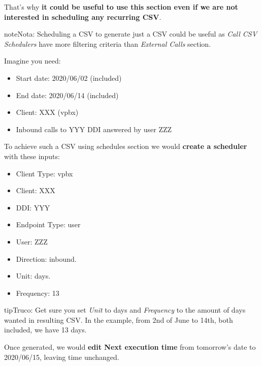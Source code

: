 \documentclass[letterpaper,10pt,spanish]{sphinxmanual}
\begin{document}
That's why \textbf{it could be useful to use this section even if we are not interested in scheduling any recurring CSV}.

\begin{notice}{note}{Nota:}
Scheduling a CSV to generate just a CSV could be useful as \emph{Call CSV Schedulers} have more filtering criteria
than \emph{External Calls} section.
\end{notice}

Imagine you need:
\begin{itemize}
\item {} 
Start date: 2020/06/02 (included)

\item {} 
End date: 2020/06/14 (included)

\item {} 
Client: XXX (vpbx)

\item {} 
Inbound calls to YYY DDI answered by user ZZZ

\end{itemize}

To achieve such a CSV using schedules section we would \textbf{create a scheduler} with these inputs:
\begin{itemize}
\item {} 
Client Type: vpbx

\item {} 
Client: XXX

\item {} 
DDI: YYY

\item {} 
Endpoint Type: user

\item {} 
User: ZZZ

\item {} 
Direction: inbound.

\item {} 
Unit: days.

\item {} 
Frequency: 13

\end{itemize}

\begin{notice}{tip}{Truco:}
Get sure you set \emph{Unit} to days and \emph{Frequency} to the amount of days wanted in resulting CSV. In the example,
from 2nd of June to 14th, both included, we have 13 days.
\end{notice}

Once generated, we would \textbf{edit Next execution time} from tomorrow's date to 2020/06/15, leaving time unchanged.
\end{document}

